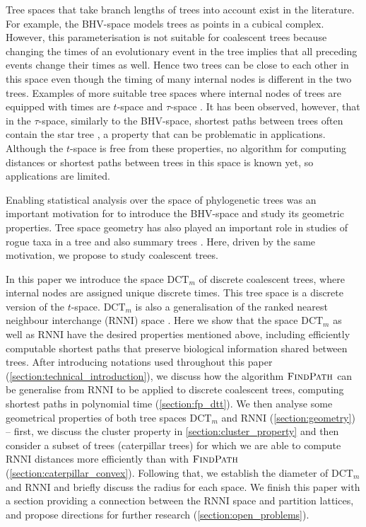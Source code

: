 \documentclass[11pt]{amsart}
\newcommand{\rnni}{\mathrm{RNNI}}
\newcommand{\findpath}{\textsc{FindPath}}
\newcommand{\dtt}{\mathrm{DCT}}
\newcommand{\summary}[1]{} %
\begin{document}
\summary{Known tree spaces -- BHV, $t$-space and $\tau$-space}
Tree spaces that take branch lengths of trees into account exist in the literature.
For example, the BHV-space \autocite{Billera2001-rj} models trees as points in a cubical complex.
However, this parameterisation is not suitable for coalescent trees because changing the times of an evolutionary event in the tree implies that all preceding events change their times as well.
Hence two trees can be close to each other in this space even though the timing of many internal nodes is different in the two trees.
Examples of more suitable tree spaces where internal nodes of trees are equipped with times are $t$-space and $\tau$-space \autocite{Gavryushkin2016-uu}.
It has been observed, however, that in the $\tau$-space, similarly to the BHV-space, shortest paths between trees often contain the star tree \autocite{Gavryushkin2016-uu}, a property that can be problematic in applications.
Although the $t$-space is free from these properties, no algorithm for computing distances or shortest paths between trees in this space is known yet, so applications are limited.

\summary{Why we want to investigate geometrical properties of $\dtt_m$ and $\rnni$}
Enabling statistical analysis over the space of phylogenetic trees was an important motivation for \textcite{Billera2001-rj} to introduce the BHV-space and study its geometric properties.
Tree space geometry has also played an important role in studies of rogue taxa in a tree \autocite{Cueto2011-bh} and also summary trees \autocite{Miller2015-rk}.
Here, driven by the same motivation, we propose to study coalescent trees.

\summary{Structure of the paper.}
In this paper we introduce the space $\dtt_m$ of discrete coalescent trees, where internal nodes are assigned unique discrete times.
This tree space is a discrete version of the $t$-space.
$\dtt_m$ is also a generalisation of the ranked nearest neighbour interchange ($\rnni$) space \autocite{Collienne2020-iu}.
Here we show that the space $\dtt_m$ as well as $\rnni$ have the desired properties mentioned above, including efficiently computable shortest paths that preserve biological information shared between trees.
After introducing notations used throughout this paper (\autoref{section:technical_introduction}), we discuss how the algorithm $\findpath$ \autocite{Collienne2020-iu} can be generalise from $\rnni$ to be applied to discrete coalescent trees, computing shortest paths in polynomial time (\autoref{section:fp_dtt}).
We then analyse some geometrical properties of both tree spaces $\dtt_m$ and $\rnni$ (\autoref{section:geometry}) -- first, we discuss the cluster property in \autoref{section:cluster_property} and then consider a subset of trees (caterpillar trees) for which we are able to compute $\rnni$ distances more efficiently than with $\findpath$ (\autoref{section:caterpillar_convex}).
Following that, we establish the diameter of $\dtt_m$ and $\rnni$ and briefly discuss the radius for each space.
We finish this paper with a section providing a connection between the $\rnni$ space and partition lattices, and propose directions for further research (\autoref{section:open_problems}).
\end{document}
